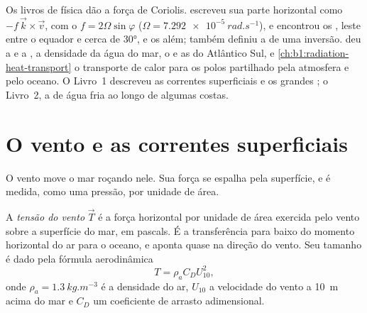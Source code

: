 \begin{recall}
Os livros de física dão a força de Coriolis.  escreveu sua parte
horizontal como $-f\,\vec k\times\vec v$, com o  $f = 2\Omega\sin\varphi$
($\Omega = \qty{7.292e-5}{rad.s^{-1}}$), e encontrou os , leste entre o equador e cerca de
\ang{30}, e os  além; também definiu a  de uma
inversão.  deu a  e a , a densidade da
água do mar, o  e as  do Atlântico Sul, e \cref{ch:b1:radiation-heat-transport}
o transporte de calor para os polos partilhado pela atmosfera e pelo oceano. O Livro~1 descreveu as
correntes superficiais e os grandes ; o Livro~2, a  de água fria ao longo de algumas costas.
\end{recall}

\section{O vento e as correntes superficiais}\label{sec:b1:ocean-circulation:wind}

O vento move o mar roçando nele. Sua força se espalha pela superfície, e é medida, como uma pressão,
por unidade de área.

\begin{definition}\label{def:b1:ocean-circulation:wind-stress}
A \emph{tensão do vento} $\vec T$ é a força horizontal por unidade de área
exercida pelo vento sobre a superfície do mar, em pascals. É a transferência para baixo do momento
horizontal do ar para o oceano, e aponta quase na direção do vento. Seu tamanho é dado pela fórmula aerodinâmica
\[
  T = \rho_a C_D U_{10}^2,
\]
onde $\rho_a = \qty{1.3}{kg.m^{-3}}$ é a densidade do ar, $U_{10}$ a velocidade do vento a
\qty{10}{m} acima do mar e $C_D$ um coeficiente de arrasto adimensional.
\end{definition}

